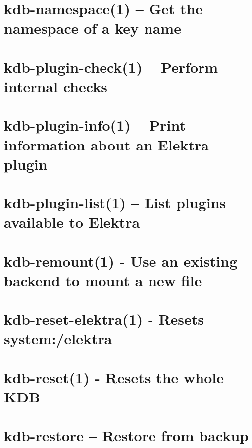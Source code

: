 \let\mypdfximage\pdfximage\def\pdfximage{\immediate\mypdfximage}\documentclass[twoside]{book}
\newcommand{\+}{\discretionary{\mbox{\scriptsize$\hookleftarrow$}}{}{}}
\begin{document}
\chapter{kdb-\/namespace(1) -- Get the namespace of a key name}
\label{doc_help_kdb-namespace_md}

\chapter{kdb-\/plugin-\/check(1) -- Perform internal checks}
\label{doc_help_kdb-plugin-check_md}

\chapter{kdb-\/plugin-\/info(1) -- Print information about an Elektra plugin}
\label{doc_help_kdb-plugin-info_md}

\chapter{kdb-\/plugin-\/list(1) -- List plugins available to Elektra}
\label{doc_help_kdb-plugin-list_md}

\chapter{kdb-\/remount(1) -\/ Use an existing backend to mount a new file}
\label{doc_help_kdb-remount_md}

\chapter{kdb-\/reset-\/elektra(1) -\/ Resets system\+:/elektra}
\label{doc_help_kdb-reset-elektra_md}

\chapter{kdb-\/reset(1) -\/ Resets the whole KDB}
\label{doc_help_kdb-reset_md}

\chapter{kdb-\/restore -- Restore from backup}
\label{doc_help_kdb-restore_md}

\end{document}
